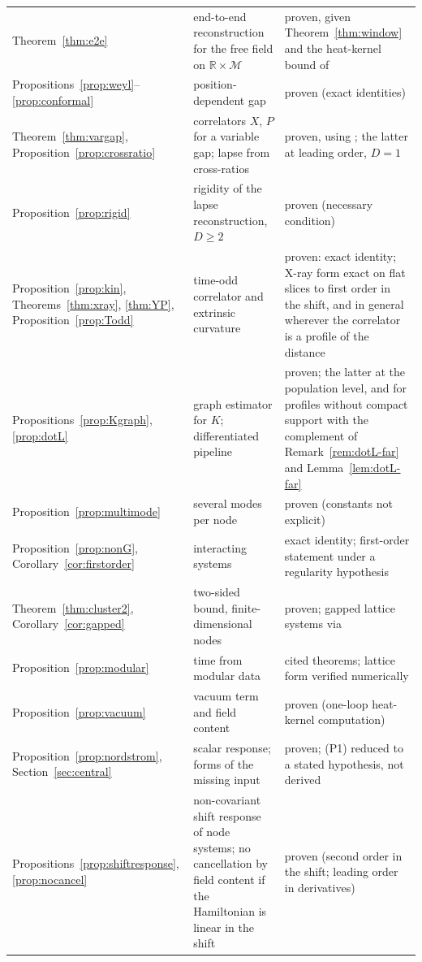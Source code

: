 \documentclass[11pt,a4paper]{article}
\theoremstyle{stmt}
\theoremstyle{defn}
\theoremstyle{rmk}
\numberwithin{equation}{section}
\newcommand{\M}{\mathcal{M}}
\newcommand{\R}{\mathbb{R}}
\begin{document}
{\begin{longtable}{@{}>{\raggedright\arraybackslash}p{}>{\raggedright\arraybackslash}p{}>{\raggedright\arraybackslash}p{}@{}}
Theorem~\ref{thm:e2e} & end-to-end reconstruction for the free field on $\R\times\M$ & proven, given Theorem~\ref{thm:window} and the heat-kernel bound of \cite{LY}\\
Propositions~\ref{prop:weyl}--\ref{prop:conformal} & position-dependent gap & proven (exact identities)\\
Theorem~\ref{thm:vargap}, Proposition~\ref{prop:crossratio} & correlators $X$, $P$ for a variable gap; lapse from cross-ratios & proven, using \cite{Ludewig}; the latter at leading order, $D=1$\\
Proposition~\ref{prop:rigid} & rigidity of the lapse reconstruction, $D\ge2$ & proven (necessary condition)\\
Proposition~\ref{prop:kin}, Theorems~\ref{thm:xray}, \ref{thm:YP}, Proposition~\ref{prop:Todd} & time-odd correlator and extrinsic curvature & proven: exact identity; X-ray form exact on flat slices to first order in the shift, and in general wherever the correlator is a profile of the distance\\
Propositions~\ref{prop:Kgraph}, \ref{prop:dotL} & graph estimator for $K$; differentiated pipeline & proven; the latter at the population level, and for profiles without compact support with the complement of Remark~\ref{rem:dotL-far} and Lemma~\ref{lem:dotL-far}\\
Proposition~\ref{prop:multimode} & several modes per node & proven (constants not explicit)\\
Proposition~\ref{prop:nonG}, Corollary~\ref{cor:firstorder} & interacting systems & exact identity; first-order statement under a regularity hypothesis\\
Theorem~\ref{thm:cluster2}, Corollary~\ref{cor:gapped} & two-sided bound, finite-dimensional nodes & proven; gapped lattice systems via \cite{HastingsKoma}\\
Proposition~\ref{prop:modular} & time from modular data & cited theorems; lattice form verified numerically\\
Proposition~\ref{prop:vacuum} & vacuum term and field content & proven (one-loop heat-kernel computation)\\
Proposition~\ref{prop:nordstrom}, Section~\ref{sec:central} & scalar response; forms of the missing input & proven; (P1) reduced to a stated hypothesis, not derived\\
Propositions~\ref{prop:shiftresponse}, \ref{prop:nocancel} & non-covariant shift response of node systems; no cancellation by field content if the Hamiltonian is linear in the shift & proven (second order in the shift; leading order in derivatives)\\

\end{longtable}}
\end{document}
